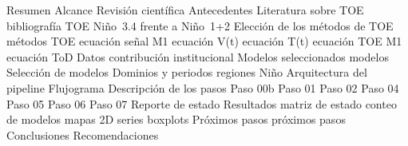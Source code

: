 \makeatletter
\def\etq#1#2{\expandafter\def\csname etq@#1\endcsname{#2}}
\etq{sec:resumen}{Resumen}
\etq{sec:alcance}{Alcance}
\etq{sec:marco}{Revisión científica}
\etq{sec:antecedentes}{Antecedentes}
\etq{sec:referencias}{Literatura sobre TOE}
\etq{tab:referencias}{bibliografía TOE}
\etq{sec:similitudes}{Niño~3.4 frente a Niño~1+2}
\etq{sec:toe_metodos}{Elección de los métodos de TOE}
\etq{tab:metodos_toe}{métodos TOE}
\etq{eq:szabo_signal}{ecuación señal M1}
\etq{eq:szabo_V}{ecuación V(t)}
\etq{eq:szabo_T}{ecuación T(t)}
\etq{eq:szabo_toe}{ecuación TOE M1}
\etq{eq:tod}{ecuación ToD}
\etq{sec:datos}{Datos}
\etq{fig:cmip6_contribution}{contribución institucional}
\etq{sec:tabla_modelos}{Modelos seleccionados}
\etq{tab:modelos}{modelos}
\etq{sec:desviacion}{Selección de modelos}
\etq{sec:dominios_periodos}{Dominios y periodos}
\etq{fig:region_nino}{regiones Niño}
\etq{sec:arquitectura}{Arquitectura del pipeline}
\etq{fig:flujograma}{Flujograma}
\etq{sec:scripts}{Descripción de los pasos}
\etq{sec:paso00b}{Paso 00b}
\etq{sec:paso01}{Paso 01}
\etq{sec:paso02}{Paso 02}
\etq{sec:paso04}{Paso 04}
\etq{sec:paso05}{Paso 05}
\etq{sec:paso06}{Paso 06}
\etq{sec:paso07}{Paso 07}
\etq{sec:reporte}{Reporte de estado}
\etq{sec:resultados}{Resultados}
\etq{fig:qc}{matriz de estado}
\etq{tab:cuentas}{conteo de modelos}
\etq{fig:mapas2d}{mapas 2D}
\etq{fig:series}{series}
\etq{fig:boxplot}{boxplots}
\etq{sec:roadmap}{Próximos pasos}
\etq{tab:roadmap}{próximos pasos}
\etq{sec:conclusiones}{Conclusiones}
\etq{sec:recomendaciones}{Recomendaciones}
\makeatother
